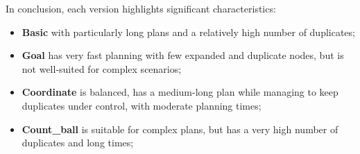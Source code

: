 \documentclass{article}
\begin{document}
In conclusion, each version highlights significant characteristics:
\begin{itemize}
    \item \textbf{Basic} with particularly long plans and a relatively high number of duplicates;
\item \textbf{Goal} has very fast planning with few expanded and duplicate nodes, but is not well-suited for complex scenarios;
\item \textbf{Coordinate} is balanced, has a medium-long plan while managing to keep duplicates under control, with moderate planning times;
\item \textbf{Count\_ball} is suitable for complex plans, but has a very high number of duplicates and long times; 
\end{itemize}
\end{document}
